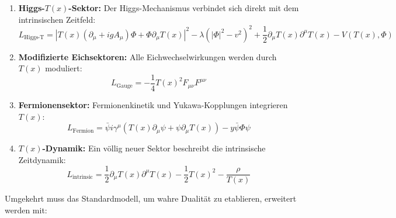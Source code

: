 \documentclass[12pt,a4paper]{article}
\newcommand{\Tfield}{T(x)}
\begin{document}
	\begin{enumerate}
		\item \textbf{Higgs-$\Tfield$-Sektor:} Der Higgs-Mechanismus verbindet sich direkt mit dem intrinsischen Zeitfeld:
		\begin{equation}
			L_{\text{Higgs-T}} = |\Tfield (\partial_{\mu} + ig A_{\mu}) \Phi + \Phi \partial_{\mu} \Tfield|^2 - \lambda (|\Phi|^2 - v^2)^2 + \frac{1}{2} \partial_{\mu} \Tfield \partial^{\mu} \Tfield - V(\Tfield, \Phi)
		\end{equation}
		\item \textbf{Modifizierte Eichsektoren:} Alle Eichwechselwirkungen werden durch $\Tfield$ moduliert:
		\begin{equation}
			L_{\text{Gauge}} = -\frac{1}{4} \Tfield^2 F_{\mu\nu} F^{\mu\nu}
		\end{equation}
		\item \textbf{Fermionensektor:} Fermionenkinetik und Yukawa-Kopplungen integrieren $\Tfield$:
		\begin{equation}
			L_{\text{Fermion}} = \bar{\psi} i \gamma^{\mu} (\Tfield \partial_{\mu} \psi + \psi \partial_{\mu} \Tfield) - y \bar{\psi} \Phi \psi
		\end{equation}
		\item \textbf{$\Tfield$-Dynamik:} Ein völlig neuer Sektor beschreibt die intrinsische Zeitdynamik:
		\begin{equation}
			L_{\text{intrinsic}} = \frac{1}{2} \partial_{\mu} \Tfield \partial^{\mu} \Tfield - \frac{1}{2} \Tfield^2 - \frac{\rho}{\Tfield}
		\end{equation}
	\end{enumerate}
	
	Umgekehrt muss das Standardmodell, um wahre Dualität zu etablieren, erweitert werden mit:
	
\end{document}
